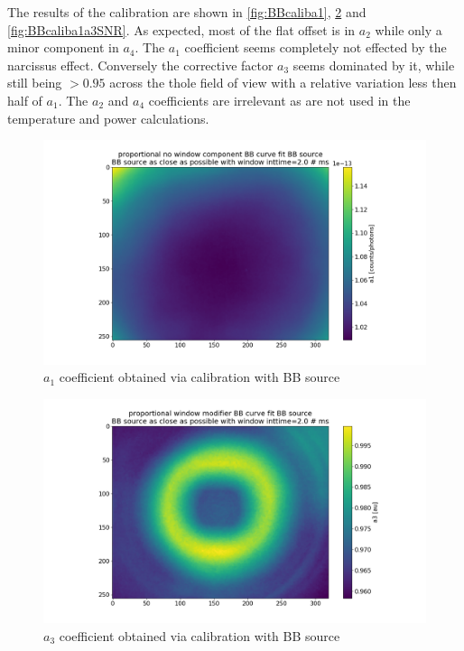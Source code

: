 The results of the calibration are shown in \autoref{fig:BBcaliba1}, \ref{fig:BBcaliba3} and \ref{fig:BBcaliba1a3SNR}. As expected, most of the flat offset is in $a_2$ while only a minor component in $a_4$. The $a_1$ coefficient seems completely not effected by the narcissus effect. Conversely the corrective factor $a_3$ seems dominated by it, while still being $>0.95$ across the thole field of view with a relative variation less then half of $a_1$. The $a_2$ and $a_4$ coefficients are irrelevant as are not used in the temperature and power calculations.

\begin{figure}
	\centering
	\includegraphics[trim={140 0 120 0},clip,width=\linewidth]{Chapters/chapter2/figs/calib_a1.png}
	\caption{$a_1$ coefficient obtained via calibration with BB source}
	\label{fig:BBcaliba1}
\end{figure}
\begin{figure}
	\centering
	\includegraphics[trim={140 0 120 0},clip,width=\linewidth]{Chapters/chapter2/figs/calib_a3.png}
	\caption{$a_3$ coefficient obtained via calibration with BB source}
	\label{fig:BBcaliba3}
\end{figure}
